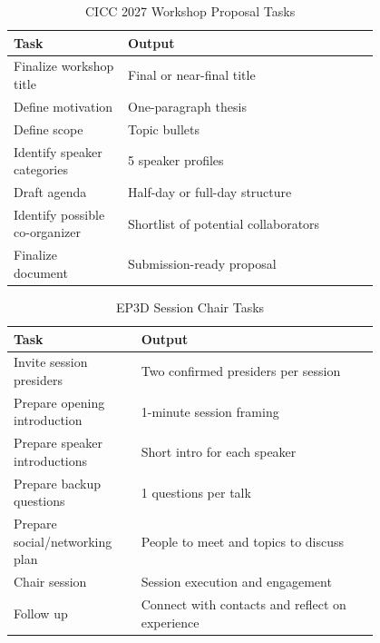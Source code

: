 \documentclass[custom, sidenote, final]{cls/oneproposal}
\begin{document}
\begin{table}[htbp]
    \centering
    \footnotesize
    \caption{CICC 2027 Workshop Proposal Tasks}\label{tab:cicc-tasks}
    \begin{tabular}{m{0.25\linewidth} p{0.55\linewidth}}
        \toprule
        \textbf{Task}                  & \textbf{Output}                      \\
        \midrule
        Finalize workshop title        & Final or near-final title            \\
        \midrule
        Define motivation              & One-paragraph thesis                 \\
        \midrule
        Define scope                   & Topic bullets                        \\
        \midrule
        Identify speaker categories    & 5\textendash6 speaker profiles       \\
        \midrule
        Draft agenda                   & Half-day or full-day structure       \\
        Identify possible co-organizer & Shortlist of potential collaborators \\
        Finalize document              & Submission-ready proposal            \\
        \bottomrule
    \end{tabular}
\end{table}



\begin{table}[htbp]
    \centering
    \footnotesize
    \caption{EP3D Session Chair Tasks}\label{tab:ep3d-tasks}
    \begin{tabular}{m{0.25\linewidth} p{0.55\linewidth}}
        \toprule
        \textbf{Task}                  & \textbf{Output}                                 \\
        \midrule
        Invite session presiders       & Two confirmed presiders per session             \\
        \midrule
        Prepare opening introduction   & 1-minute session framing                        \\
        \midrule
        Prepare speaker introductions  & Short intro for each speaker                    \\
        \midrule
        Prepare backup questions       & 1\textendash 2 questions per talk               \\
        \midrule
        Prepare social/networking plan & People to meet and topics to discuss            \\
        \midrule
        Chair session                  & Session execution and engagement                \\
        Follow up                      & Connect with contacts and reflect on experience \\
        \bottomrule
    \end{tabular}
\end{table}
\end{document}
